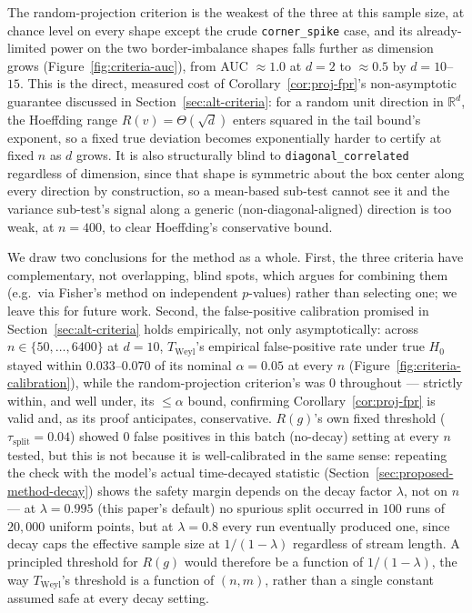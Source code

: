 \documentclass[11pt]{article}
\begin{document}
The random-projection criterion is the weakest of the three at this sample size, at chance level on every shape except the crude \texttt{corner\_spike} case, and its already-limited power on the two border-imbalance shapes falls further as dimension grows (Figure~\ref{fig:criteria-auc}), from AUC $\approx 1.0$ at $d=2$ to $\approx 0.5$ by $d=10$--$15$. This is the direct, measured cost of Corollary~\ref{cor:proj-fpr}'s non-asymptotic guarantee discussed in Section~\ref{sec:alt-criteria}: for a random unit direction in $\mathbb{R}^d$, the Hoeffding range $R(v)=\Theta(\sqrt{d})$ enters squared in the tail bound's exponent, so a fixed true deviation becomes exponentially harder to certify at fixed $n$ as $d$ grows. It is also structurally blind to \texttt{diagonal\_correlated} regardless of dimension, since that shape is symmetric about the box center along every direction by construction, so a mean-based sub-test cannot see it and the variance sub-test's signal along a generic (non-diagonal-aligned) direction is too weak, at $n=400$, to clear Hoeffding's conservative bound.

We draw two conclusions for the method as a whole. First, the three criteria have complementary, not overlapping, blind spots, which argues for combining them (e.g.\ via Fisher's method on independent $p$-values) rather than selecting one; we leave this for future work. Second, the false-positive calibration promised in Section~\ref{sec:alt-criteria} holds empirically, not only asymptotically: across $n\in\{50,\ldots,6400\}$ at $d=10$, $T_{\mathrm{Weyl}}$'s empirical false-positive rate under true $H_0$ stayed within $0.033$--$0.070$ of its nominal $\alpha=0.05$ at every $n$ (Figure~\ref{fig:criteria-calibration}), while the random-projection criterion's was $0$ throughout — strictly within, and well under, its $\le \alpha$ bound, confirming Corollary~\ref{cor:proj-fpr} is valid and, as its proof anticipates, conservative. $R(g)$'s own fixed threshold ($\tau_{\text{split}}=0.04$) showed $0$ false positives in this batch (no-decay) setting at every $n$ tested, but this is not because it is well-calibrated in the same sense: repeating the check with the model's actual time-decayed statistic (Section~\ref{sec:proposed-method-decay}) shows the safety margin depends on the decay factor $\lambda$, not on $n$ — at $\lambda=0.995$ (this paper's default) no spurious split occurred in $100$ runs of $20{,}000$ uniform points, but at $\lambda=0.8$ every run eventually produced one, since decay caps the effective sample size at $1/(1-\lambda)$ regardless of stream length. A principled threshold for $R(g)$ would therefore be a function of $1/(1-\lambda)$, the way $T_{\mathrm{Weyl}}$'s threshold is a function of $(n,m)$, rather than a single constant assumed safe at every decay setting.
\end{document}
